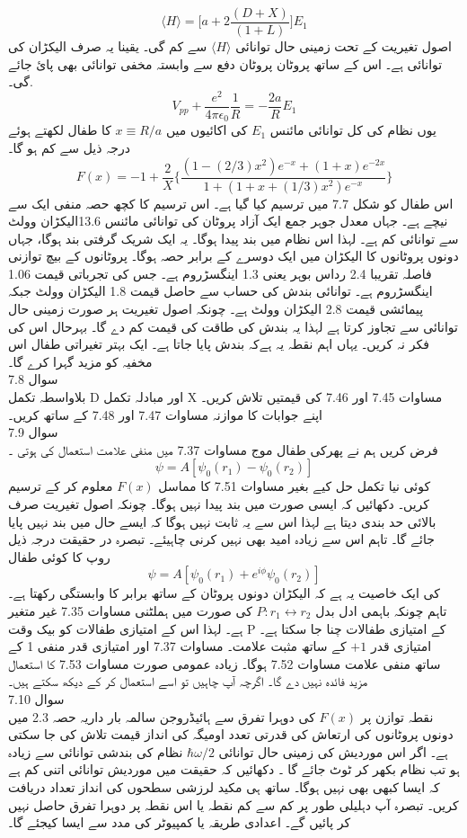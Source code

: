 \documentclass{book}
\begin{document}
\[\langle H \rangle =\big[a+2\frac{(D+X)}{(1+L)}\big]E_{1}\]
اصول تغیریت کے تحت زمینی حال توانائی  
\(\langle H \rangle\)
 سے کم گی۔ یقینا  یہ صرف الیکڑان کی توانائی ہے۔ اس کے ساتھ پروٹان پروٹان دفع سے وابستہ مخفی توانائی بھی پائ جائے گی۔.
\[V_{pp}+\frac{e^{2}}{4\pi\epsilon_{0}}\frac{1}{R}=-\frac{2a}{R}E_{1}\]
یوں نظام کی  کل توانائی مائنس
\(E_{1}\)
  کی  اکائیوں میں 
  \(x\equiv R/a\)
  کا طفال لکھتے ہوئے درجہ ذیل سے کم ہو گا۔
  \[F(x)=-1+\frac{2}{X}\big\{\frac{(1-(2/3)x^{2})e^{-x}+(1+x)e^{-2x}}{1+(1+x+(1/3)x^{2})e^{-x}}\big\}\]
اس طفال کو شکل 7.7 میں ترسیم کیا گیا ہے۔ اس ترسیم کا کچھ حصہ منفی ایک سے نیچے ہے۔ جہاں معدل جوہر جمع ایک آزاد پروٹان کی توانائی مائنس  13.6الیکڑان وولٹ سے توانائی کم ہے۔ لہذا اس نظام میں بند پیدا ہوگا۔ یہ ایک شریک گرفتی بند ہوگا، جہاں دونوں پروٹانوں کا الیکڑان میں ایک دوسرے کے برابر حصہ ہوگا۔ پروٹانوں کے بیچ توازنی فاصلہ تقریبا 2.4 رداس بوہر یعنی 1.3 اینگسڑروم ہے۔ جس کی تجرباتی قیمت 1.06 اینگسڑروم ہے۔ توانائی بندش کی حساب سے حاصل قیمت 1.8 الیکڑان وولٹ جبکہ پیمائشی قیمت 2.8 الیکڑان وولٹ ہے۔ چونکہ اصول تغیریت ہر صورت زمینی حال توانائی سے تجاوز کرتا ہے لہذا یہ بندش کی طاقت کی قیمت کم دے گا۔ بہرحال اس کی فکر نہ کریں۔ یہاں اہم نقطہ یہ ہےکہ بندش پایا جاتا ہے۔ ایک بہتر تغیراتی طفال اس مخفیہ کو مزید گہرا کرے گا۔ \\
سوال 
7.8\\
بلاواسطہ تکمل D اور مبادلہ تکمل X مساوات 7.45 اور 7.46 کی قیمتیں تلاش کریں۔ اپنے جوابات کا موازنہ مساوات 7.47 اور 7.48 کے ساتھ کریں۔ \\
سوال 
7.9\\
فرض کریں ہم نے پھرکی طفال موج مساوات 7.37 میں منفی علامت استعمال کی ہوتی ۔
\[\psi=A[\psi_{0}(r_{1})-\psi_{0}(r_{2})]\]
کوئی نیا تکمل حل کیے بغیر مساوات  7.51 کا مماسل
\( F(x)\) 
معلوم کر کے ترسیم کریں۔ دکھائیں کہ ایسی صورت میں بند پیدا نہیں ہوگا۔ چونکہ اصول تغیریت صرف بالائی حد بندی دیتا ہے لہذا اس سے یہ ثابت نہیں ہوگا کہ ایسے حال میں بند نہیں پایا جائے گا۔ تاہم اس سے زیادہ امید بھی نہیں کرنی چاہیئے۔ تبصرہ در حقیقت درجہ ذیل روپ کا کوئی طفال 
\[\psi=A[\psi_{0}(r_{1})+e^{i\phi}\psi_{0}(r_{2})]\]
کی ایک خاصیت یہ ہے کہ  الیکڑان دونوں پروٹان کے ساتھ برابر کا وابستگی رکھتا ہے۔ تاہم چونکہ باہمی ادل بدل 
\(P: r_{1}\leftrightarrow r_{2}\)
کی صورت میں ہملٹنی مساوات 7.35 غیر متغیر ہے۔ لہذا اس کے امتیازی طفالات کو بیک وقت P کے امتیازی طفالات چنا جا سکتا ہے۔ امتیازی قدر
\(+1\)
کے ساتھ مثبت علامت۔ مساوات 7.37 اور امتیازی قدر منفی 1 کے ساتھ منفی علامت مساوات 7.52 ہوگا۔ زیادہ عمومی صورت مساوات 7.53 کا استعمال مزید فائدہ نہیں دے گا۔ اگرچہ آپ چاہیں تو اسے استعمال کر کے دیکھ سکتے ہیں۔\\
سوال 
7.10\\
نقطہ توازن پر
\( F(x)\)
 کی دوہرا تفرق سے ہائیڈروجن سالمہ بار داریہ حصہ 2.3 میں دونوں پروٹانوں کی ارتعاش کی قدرتی تعدد اومیگہ کی انداز قیمت تلاش کی جا سکتی ہے۔ اگر اس موردیش کی زمینی حال توانائی 
 \(\hbar\omega/2\)
 نظام کی بندشی توانائی سے زیادہ ہو تب نظام بکھر کر ٹوٹ جائے گا ۔ دکھائیں کہ حقیقت میں موردیش توانائی اتنی کم ہے کہ ایسا کبھی بھی نہیں ہوگا۔ ساتھ ہی مکید لرزشی سطحوں کی انداز  تعداد دریافت کریں۔ تبصرہ 
آپ دہلیلی طور پر کم سے کم نقطہ یا اس نقطہ پر دوہرا تفرق حاصل نہیں کر پائیں گے۔ اعدادی طریقہ یا کمپیوٹر کی مدد سے  ایسا کیجئے گا۔\\
\end{document}
